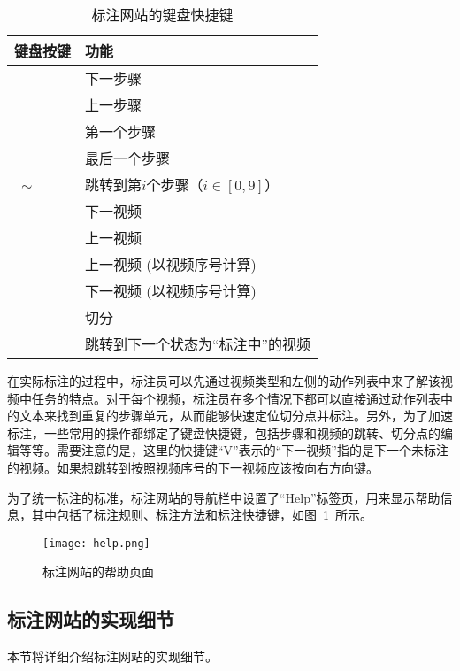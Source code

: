 \begin{table}[!h]
    \caption{标注网站的键盘快捷键}
    \begin{tabu}to\textwidth{X[c]X[c]}\toprule
        键盘按键 & 功能\\\midrule
        	& 下一步骤\\
        	& 上一步骤\\
        	& 第一个步骤\\
        	& 最后一个步骤\\
        ~$\sim$~	& 跳转到第$i$个步骤（$i\in[0, 9]$）\\
        	& 下一视频\\
        	& 上一视频\\
        \keys{\arrowkeyleft}    & 上一视频 (以视频序号计算)\\
        \keys{\arrowkeyright} & 下一视频 (以视频序号计算)\\
        	& 切分\\
        	& 跳转到下一个状态为“标注中”的视频\\\bottomrule
    \end{tabu}
\end{table}

在实际标注的过程中，标注员可以先通过视频类型和左侧的动作列表中来了解该视频中任务的特点。对于每个视频，标注员在多个情况下都可以直接通过动作列表中的文本来找到重复的步骤单元，从而能够快速定位切分点并标注。另外，为了加速标注，一些常用的操作都绑定了键盘快捷键，包括步骤和视频的跳转、切分点的编辑等等。需要注意的是，这里的快捷键“V”表示的“下一视频”指的是下一个未标注的视频。如果想跳转到按照视频序号的下一视频应该按向右方向键。

为了统一标注的标准，标注网站的导航栏中设置了“Help”标签页，用来显示帮助信息，其中包括了标注规则、标注方法和标注快捷键，如图~\ref{fig:help}~所示。

\begin{figure}[htbp]
    \centering
    \texttt{[image: help.png]}
    \caption{标注网站的帮助页面}
    \label{fig:help}
\end{figure}

\subsection{标注网站的实现细节}
本节将详细介绍标注网站的实现细节。
